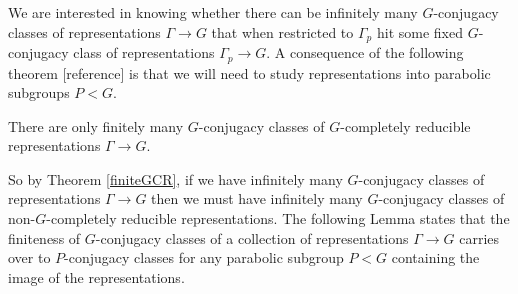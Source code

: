 We are interested in knowing whether there can be infinitely many $G$-conjugacy classes of representations $\Gamma\rightarrow G$ that when restricted to $\Gamma_p$ hit some fixed $G$-conjugacy class of representations $\Gamma_p\rightarrow G$. A consequence of the following theorem [reference] is that we will need to study representations into parabolic subgroups $P < G$.

\begin{theorem} \label{finiteGCR} There are only finitely many $G$-conjugacy classes of $G$-completely reducible representations $\Gamma\rightarrow G$.
\end{theorem}

So by Theorem \ref{finiteGCR}, if we have infinitely many $G$-conjugacy classes of representations $\Gamma\rightarrow G$ then we must have infinitely many $G$-conjugacy classes of non-$G$-completely reducible representations. The following Lemma states that the finiteness of $G$-conjugacy classes of a collection of representations $\Gamma\rightarrow G$ carries over to $P$-conjugacy classes for any parabolic subgroup $P<G$ containing the image of the representations.


